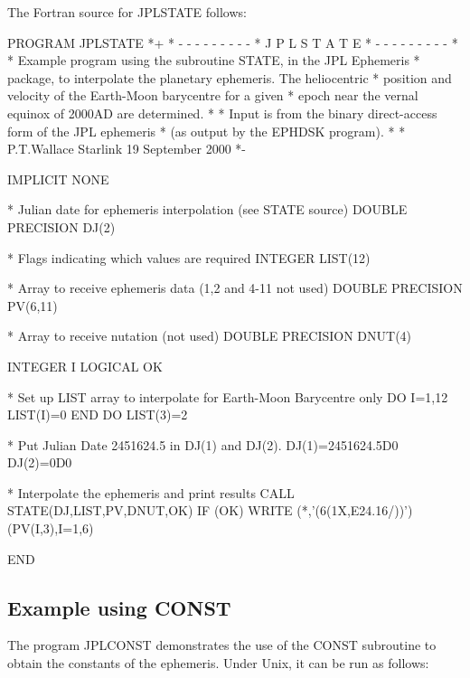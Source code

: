 \documentclass[twoside,11pt,nolof]{starlink}
\begin{document}
The Fortran source for JPLSTATE follows:

\begin{small}
\begin{terminalv}
      PROGRAM JPLSTATE
*+
*  - - - - - - - - -
*   J P L S T A T E
*  - - - - - - - - -
*
*  Example program using the subroutine STATE, in the JPL Ephemeris
*  package, to interpolate the planetary ephemeris.  The heliocentric
*  position and velocity of the Earth-Moon barycentre for a given
*  epoch near the vernal equinox of 2000AD are determined.
*
*  Input is from the binary direct-access form of the JPL ephemeris
*  (as output by the EPHDSK program).
*
*  P.T.Wallace   Starlink   19 September 2000
*-

      IMPLICIT NONE

*  Julian date for ephemeris interpolation (see STATE source)
      DOUBLE PRECISION DJ(2)

*  Flags indicating which values are required
      INTEGER LIST(12)

*  Array to receive ephemeris data (1,2 and 4-11 not used)
      DOUBLE PRECISION PV(6,11)

*  Array to receive nutation (not used)
      DOUBLE PRECISION DNUT(4)

      INTEGER I
      LOGICAL OK

*  Set up LIST array to interpolate for Earth-Moon Barycentre only
      DO I=1,12
         LIST(I)=0
      END DO
      LIST(3)=2

*  Put Julian Date 2451624.5 in DJ(1) and DJ(2).
      DJ(1)=2451624.5D0
      DJ(2)=0D0

*  Interpolate the ephemeris and print results
      CALL STATE(DJ,LIST,PV,DNUT,OK)
      IF (OK) WRITE (*,'(6(1X,E24.16/))') (PV(I,3),I=1,6)

      END

\end{terminalv}
\end{small}

\subsection{Example using CONST}
\label{example_using_const}

The program JPLCONST demonstrates the use of the CONST subroutine to obtain the
constants of the ephemeris.  Under Unix, it can be run as follows:

\begin{terminalv}
\end{terminalv}
\end{document}
